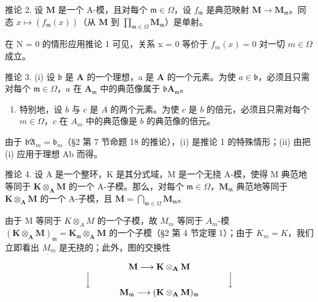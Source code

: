 推论 2. 设 \(\mathbf{M}\) 是一个 A-模，且对每个 \(\mathfrak{m} \in \Omega\)，设 \(f_{\mathfrak{m}}\) 是典范映射 \(\mathbf{M} \to \mathbf{M}_{\mathfrak{m}}\)。同态 \(x \mapsto (f_{\mathfrak{m}}(x))\)（从 \(\mathbf{M}\) 到 \(\prod_{\mathfrak{m} \in \Omega} \mathbf{M}_{\mathfrak{m}}\)）是单射。

在 N = 0 的情形应用推论 1 可见，关系 x = 0 等价于 \(f_{m}(x) = 0\) 对一切 \(m \in \Omega\) 成立。

推论 3. (i) 设 \(\mathfrak{b}\) 是 \(\mathbf{A}\) 的一个理想，a 是 \(\mathbf{A}\) 的一个元素。为使 \(a \in \mathfrak{b}\)，必须且只需对每个 \(\mathfrak{m} \in \Omega\)，\(a\) 在 \(\mathbf{A}_{\mathfrak{m}}\) 中的典范像属于 \(\mathfrak{b}\mathbf{A}_{\mathfrak{m}}\)。

\begin{enumerate}
\def\labelenumi{(\roman{enumi})}
\setcounter{enumi}{1}
\tightlist
\item
  特别地，设 \(b\) 与 \(c\) 是 \(A\) 的两个元素。为使 \(c\) 是 \(b\) 的倍元，必须且只需对每个 \(m \in \Omega\)，\(c\) 在 \(A_m\) 中的典范像是 \(b\) 的典范像的倍元。
\end{enumerate}

由于 \(\mathfrak{bA}_{m} = \mathfrak{b}_{m}\)（§2 第 7 节命题 18 的推论），(i) 是推论 1 的特殊情形；(ii) 由把 (i) 应用于理想 Ab 而得。

推论 4. 设 A 是一个整环，K 是其分式域，M 是一个无挠 A-模，使得 M 典范地等同于 \(\mathbf{K} \otimes_{\mathbf{A}} \mathbf{M}\) 的一个 A-子模。那么，对每个 \(\mathfrak{m} \in \Omega\)，\(\mathbf{M}_{\mathfrak{m}}\) 典范地等同于 \(\mathbf{K} \otimes_{\mathbf{A}} \mathbf{M}\) 的一个 A-子模，且 \(\mathbf{M} = \bigcap_{\mathfrak{m} \in \Omega} \mathbf{M}_{\mathfrak{m}}\)。

由于 M 等同于 \(K \otimes_{A} M\) 的一个子模，故 \(M_{m}\) 等同于 \(A_{m}\)-模 \((\mathbf{K} \otimes_{\mathbf{A}} \mathbf{M})_{\mathfrak{m}} = \mathbf{K}_{\mathfrak{m}} \otimes_{\mathbf{A}} \mathbf{M}\) 的一个子模（§2 第 4 节定理 1）；由于 \(K_{m} = K\)，我们立即看出 \(M_{m}\) 是无挠的；此外，图的交换性

\[
\begin{array}{c} \mathbf {M} \longrightarrow \mathbf {K} \otimes_ {\mathbf {A}} \mathbf {M} \\ \Big \downarrow \qquad \qquad \qquad \qquad \qquad \qquad \qquad \qquad \Big \downarrow \\ \mathbf {M} _ {\mathfrak {m}} \longrightarrow (\mathbf {K} \otimes_ {\mathbf {A}} \mathbf {M}) _ {\mathfrak {m}} \end{array}
\]

